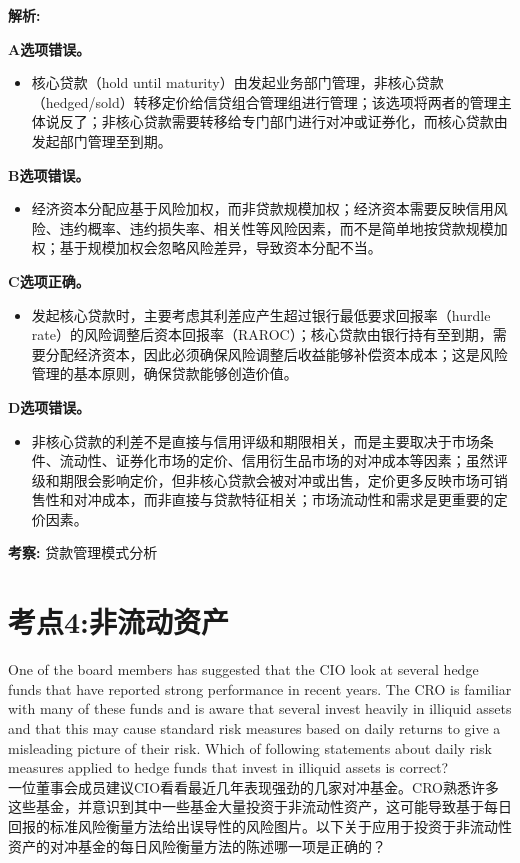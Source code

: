 \documentclass{article}
\newcounter{question} %
\newenvironment{explanation}
{\textbf{解析:}\par}
{\par}
\newcommand{\checklist}[1]{
    \textbf{考察:} #1 \par %
    \addcontentsline{toc}{subsection}{题号\thequestion 考察: #1} %
    \vspace{2em} %
}
\begin{document}
\begin{explanation}
    \textbf{A选项错误。}
    \begin{itemize}
        \item 核心贷款（hold until maturity）由发起业务部门管理，非核心贷款（hedged/sold）转移定价给信贷组合管理组进行管理；该选项将两者的管理主体说反了；非核心贷款需要转移给专门部门进行对冲或证券化，而核心贷款由发起部门管理至到期。
    \end{itemize}

    \textbf{B选项错误。}
    \begin{itemize}
        \item 经济资本分配应基于风险加权，而非贷款规模加权；经济资本需要反映信用风险、违约概率、违约损失率、相关性等风险因素，而不是简单地按贷款规模加权；基于规模加权会忽略风险差异，导致资本分配不当。
    \end{itemize}

    \textbf{C选项正确。}
    \begin{itemize}
        \item 发起核心贷款时，主要考虑其利差应产生超过银行最低要求回报率（hurdle rate）的风险调整后资本回报率（RAROC）；核心贷款由银行持有至到期，需要分配经济资本，因此必须确保风险调整后收益能够补偿资本成本；这是风险管理的基本原则，确保贷款能够创造价值。
    \end{itemize}

    \textbf{D选项错误。}
    \begin{itemize}
        \item 非核心贷款的利差不是直接与信用评级和期限相关，而是主要取决于市场条件、流动性、证券化市场的定价、信用衍生品市场的对冲成本等因素；虽然评级和期限会影响定价，但非核心贷款会被对冲或出售，定价更多反映市场可销售性和对冲成本，而非直接与贷款特征相关；市场流动性和需求是更重要的定价因素。
    \end{itemize}
\end{explanation}

\checklist{贷款管理模式分析}




\newpage


\section{考点4:非流动资产}
\setcounter{question}{0}


\begin{question}
    One of the board members has suggested that the CIO look at several hedge funds that have reported strong performance in recent years. The CRO is familiar with many of these funds and is aware that several invest heavily in illiquid assets and that this may cause standard risk measures based on daily returns to give a misleading picture of their risk. Which of following statements about daily risk measures applied to hedge funds that invest in illiquid assets is correct?
    \\一位董事会成员建议CIO看看最近几年表现强劲的几家对冲基金。CRO熟悉许多这些基金，并意识到其中一些基金大量投资于非流动性资产，这可能导致基于每日回报的标准风险衡量方法给出误导性的风险图片。以下关于应用于投资于非流动性资产的对冲基金的每日风险衡量方法的陈述哪一项是正确的？
\end{question}
\end{document}
